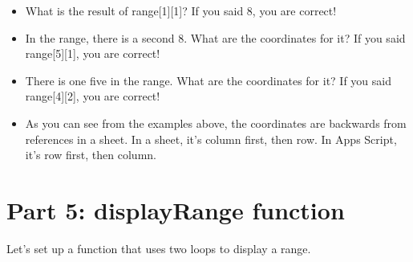 \documentclass{article}
\begin{document}
\begin{itemize}
    \item What is the result of range[1][1]?  If you said 8, you are correct!
    \item In the range, there is a second 8.  What are the coordinates for it?  If you said range[5][1], you are correct!
    \item There is one five in the range.  What are the coordinates for it?  If you said range[4][2], you are correct!
    \item As you can see from the examples above, the coordinates are backwards from references in a sheet.  In a sheet, it's column first, then row.  In Apps Script, it's row first, then column. 
\end{itemize}

\section*{Part 5: displayRange function}
Let's set up a function that uses two loops to display a range.  
\end{document}
